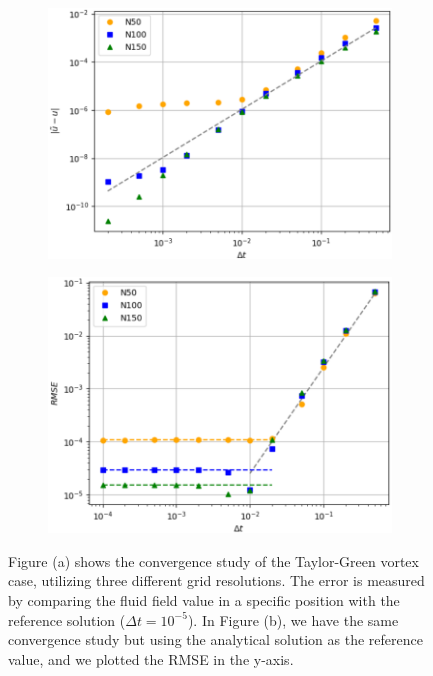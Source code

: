 \documentclass[
  english,        %
  font=times,     %
  onecolumn,      %
]{tumarticle}
\begin{document}
\begin{figure}[!htbp]
    \centering
    \begin{subfigure}[b]{0.49\textwidth}
      \includegraphics[width=\textwidth]{resources/convergence_study_openfoam.png}
      \caption{}
      \label{fig:convergence_openfoam}
    \end{subfigure}
    \hspace{1pt}
    \begin{subfigure}[b]{0.49\textwidth}
        \includegraphics[width=\textwidth]{resources/RMSE_study.png}
      \caption{}
      \label{fig:RMSE_openfoam}
    \end{subfigure}
    \caption{Figure (a) shows the convergence study of the Taylor-Green vortex case, utilizing three different grid resolutions. The error is measured by comparing the fluid field value in a specific position with the reference solution ($\Delta t = 10^{-5}$). In Figure (b), we have the same convergence study but using the analytical solution as the reference value, and we plotted the RMSE in the y-axis.}
    \label{fig:figures}
  \end{figure}
  
\end{document}
